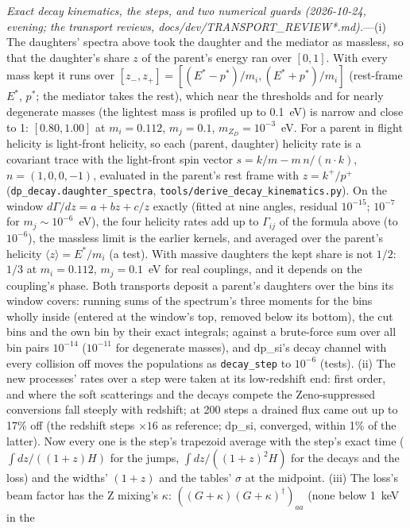 \documentclass[11pt,a4paper]{article}
\newcommand{\file}[1]{\nolinkurl{#1}}
\newcommand{\mzd}{m_{Z_D}}
\begin{document}
\textit{Exact decay kinematics, the steps, and two numerical guards (2026-10-24, evening; the transport reviews,
docs/dev/TRANSPORT\_REVIEW*.md).}---(i) The daughters' spectra above took the daughter and the mediator as massless,
so that the daughter's share $z$ of the parent's energy ran over $[0,1]$. With every mass kept it runs over
$[z_-, z_+] = [(E^* - p^*)/m_i, (E^* + p^*)/m_i]$ (rest-frame $E^*$, $p^*$; the mediator takes the rest), which near
the thresholds and for nearly degenerate masses (the lightest mass is profiled up to 0.1~eV) is narrow and close to 1:
$[0.80, 1.00]$ at $m_i = 0.112$, $m_j = 0.1$, $\mzd = 10^{-3}$~eV. For a parent in flight helicity is light-front
helicity, so each (parent, daughter) helicity rate is a covariant trace with the light-front spin vector
$s = k/m - m\,n/(n\cdot k)$, $n = (1, 0, 0, -1)$, evaluated in the parent's rest frame with $z = k^+/p^+$
(\texttt{dp\_decay.daughter\_spectra}, \file{tools/derive\_decay\_kinematics.py}). On the window
$d\Gamma/dz = a + b z + c/z$ exactly (fitted at nine angles, residual $10^{-15}$; $10^{-7}$ for $m_j \sim 10^{-6}$~eV),
the four helicity rates add up to $\Gamma_{ij}$ of the formula above (to $10^{-6}$), the massless limit is the earlier
kernels, and averaged over the parent's helicity $\langle z\rangle = E^*/m_i$ (a test). With massive daughters the
kept share is not $1/2$: $1/3$ at $m_i = 0.112$, $m_j = 0.1$~eV for real couplings, and it depends on the coupling's
phase. Both transports deposit a parent's daughters over the bins its window covers: running sums of the spectrum's
three moments for the bins wholly inside (entered at the window's top, removed below its bottom), the cut bins and the
own bin by their exact integrals; against a brute-force sum over all bin pairs $10^{-14}$ ($10^{-11}$ for degenerate
masses), and dp\_si's decay channel with every collision off moves the populations as \texttt{decay\_step} to
$10^{-6}$ (tests). (ii) The new processes' rates over a step were taken at its low-redshift end: first order, and where
the soft scatterings and the decays compete the Zeno-suppressed conversions fall steeply with redshift; at 200 steps a
drained flux came out up to 17\% off (the redshift steps $\times16$ as reference; dp\_si, converged, within 1\% of the
latter). Now every one is the step's trapezoid average with the step's exact time ($\int dz/((1+z)H)$ for the jumps,
$\int dz/((1+z)^2H)$ for the decays and the loss) and the widths' $(1+z)$ and the tables' $\sigma$ at the midpoint.
(iii) The loss's beam factor has the Z mixing's $\kappa$: $((G+\kappa)(G+\kappa)^\dagger)_{aa}$ (none below 1~keV in the
\end{document}
